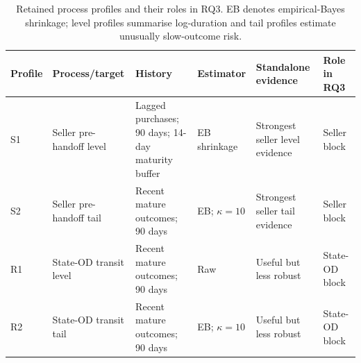 \begin{table}[H]
\centering
\caption{Retained process profiles and their roles in RQ3. EB denotes empirical-Bayes shrinkage; level profiles summarise log-duration and tail profiles estimate unusually slow-outcome risk.}
\label{tab:retained-profiles}
\footnotesize
\setlength{\tabcolsep}{3pt}
\renewcommand{\arraystretch}{1.15}
\begin{tabularx}{\textwidth}{@{}>{\RaggedRight\arraybackslash}p{} >{\RaggedRight\arraybackslash}p{} >{\RaggedRight\arraybackslash}p{} >{\RaggedRight\arraybackslash}p{} >{\RaggedRight\arraybackslash}X >{\RaggedRight\arraybackslash}p{}@{}}
\toprule
Profile & Process/target & History & Estimator & Standalone evidence & Role in RQ3 \\
\midrule
S1 & Seller pre-handoff level & Lagged purchases; 90 days; 14-day maturity buffer & EB shrinkage & Strongest seller level evidence & Seller block \\
S2 & Seller pre-handoff tail & Recent mature outcomes; 90 days & EB; $\kappa=10$ & Strongest seller tail evidence & Seller block \\
R1 & State-OD transit level & Recent mature outcomes; 90 days & Raw & Useful but less robust & State-OD block \\
R2 & State-OD transit tail & Recent mature outcomes; 90 days & EB; $\kappa=10$ & Useful but less robust & State-OD block \\
\bottomrule
\end{tabularx}
\end{table}
